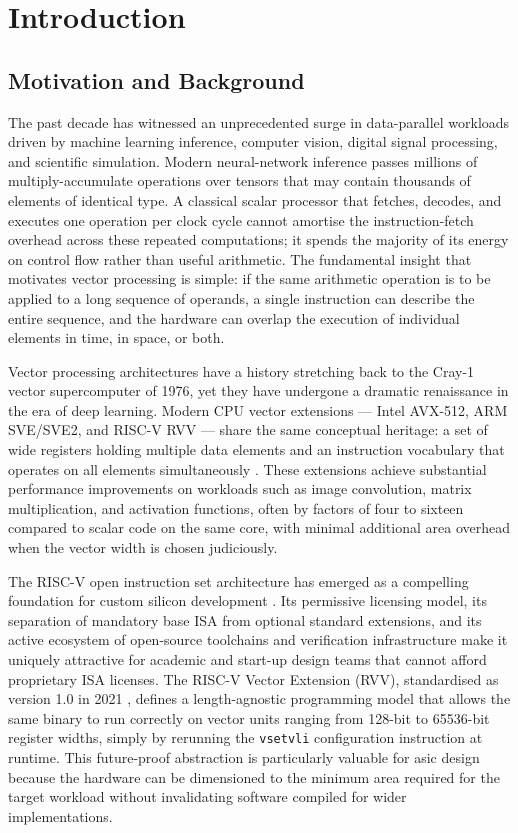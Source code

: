 \chapter{Introduction}
\label{ch:introduction}

\section{Motivation and Background}
\label{sec:motivation}

The past decade has witnessed an unprecedented surge in data-parallel workloads driven
by machine learning inference, computer vision, digital signal processing, and scientific
simulation. Modern neural-network inference passes millions of multiply-accumulate
operations over tensors that may contain thousands of elements of identical type.
A classical scalar processor that fetches, decodes, and executes one operation per
clock cycle cannot amortise the instruction-fetch overhead across these repeated
computations; it spends the majority of its energy on control flow rather than useful
arithmetic. The fundamental insight that motivates vector processing is simple: if the
same arithmetic operation is to be applied to a long sequence of operands, a single
instruction can describe the entire sequence, and the hardware can overlap the execution
of individual elements in time, in space, or both.

Vector processing architectures have a history stretching back to the Cray-1 vector
supercomputer of 1976, yet they have undergone a dramatic renaissance in the era of
deep learning. Modern CPU vector extensions --- Intel AVX-512, ARM SVE/SVE2, and
RISC-V RVV --- share the same conceptual heritage: a set of wide registers holding
multiple data elements and an instruction vocabulary that operates on all elements
simultaneously \cite{simd-intro}. These extensions achieve substantial performance
improvements on workloads such as image convolution, matrix multiplication, and
activation functions, often by factors of four to sixteen compared to scalar code on
the same core, with minimal additional area overhead when the vector width is chosen
judiciously.

The RISC-V open instruction set architecture has emerged as a compelling foundation for
custom silicon development \cite{riscv-spec-2019, patterson2020risc}. Its permissive
licensing model, its separation of mandatory base ISA from optional standard extensions,
and its active ecosystem of open-source toolchains and verification infrastructure make
it uniquely attractive for academic and start-up design teams that cannot afford
proprietary ISA licenses. The RISC-V Vector Extension (RVV), standardised as version
1.0 in 2021 \cite{rvv-spec-1-0}, defines a length-agnostic programming model that
allows the same binary to run correctly on vector units ranging from 128-bit to 65536-bit
register widths, simply by rerunning the \texttt{vsetvli} configuration instruction
at runtime. This future-proof abstraction is particularly valuable for \gls{asic}
design because the hardware can be dimensioned to the minimum area required for the
target workload without invalidating software compiled for wider implementations.

